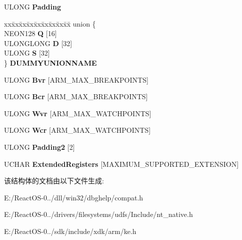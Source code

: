 \begin{DoxyCompactItemize}
U\+L\+O\+NG {\bfseries Padding}
\item 
\mbox{\label{struct___c_o_n_t_e_x_t_a6259ce9211fe00836b7887301ba8e7c3}} 
\begin{tabbing}
xx\=xx\=xx\=xx\=xx\=xx\=xx\=xx\=xx\=\kill
union \{\\
\>NEON128 {\bfseries Q} \mbox{[}16\mbox{]}\\
\>ULONGLONG {\bfseries D} \mbox{[}32\mbox{]}\\
\>ULONG {\bfseries S} \mbox{[}32\mbox{]}\\
\} {\bfseries DUMMYUNIONNAME}\\

\end{tabbing}\item 
\mbox{\label{struct___c_o_n_t_e_x_t_acd64d36dea821c301eb9336bda3dee7c}} 
U\+L\+O\+NG {\bfseries Bvr} \mbox{[}A\+R\+M\+\_\+\+M\+A\+X\+\_\+\+B\+R\+E\+A\+K\+P\+O\+I\+N\+TS\mbox{]}
\item 
\mbox{\label{struct___c_o_n_t_e_x_t_af8dd52b1a2387c35e9978ce4ac0798ef}} 
U\+L\+O\+NG {\bfseries Bcr} \mbox{[}A\+R\+M\+\_\+\+M\+A\+X\+\_\+\+B\+R\+E\+A\+K\+P\+O\+I\+N\+TS\mbox{]}
\item 
\mbox{\label{struct___c_o_n_t_e_x_t_a343bcf5cf087b142b8fc9dfec2f2bf0b}} 
U\+L\+O\+NG {\bfseries Wvr} \mbox{[}A\+R\+M\+\_\+\+M\+A\+X\+\_\+\+W\+A\+T\+C\+H\+P\+O\+I\+N\+TS\mbox{]}
\item 
\mbox{\label{struct___c_o_n_t_e_x_t_a73fdc94e1e76eaf859e38864be6d1e66}} 
U\+L\+O\+NG {\bfseries Wcr} \mbox{[}A\+R\+M\+\_\+\+M\+A\+X\+\_\+\+W\+A\+T\+C\+H\+P\+O\+I\+N\+TS\mbox{]}
\item 
\mbox{\label{struct___c_o_n_t_e_x_t_aa59cdc1fe3470d00151643861a38c288}} 
U\+L\+O\+NG {\bfseries Padding2} \mbox{[}2\mbox{]}
\item 
\mbox{\label{struct___c_o_n_t_e_x_t_ad7822115a1a0e0d14220f7a389f441a1}} 
U\+C\+H\+AR {\bfseries Extended\+Registers} \mbox{[}M\+A\+X\+I\+M\+U\+M\+\_\+\+S\+U\+P\+P\+O\+R\+T\+E\+D\+\_\+\+E\+X\+T\+E\+N\+S\+I\+ON\mbox{]}
\end{DoxyCompactItemize}


该结构体的文档由以下文件生成\+:\begin{DoxyCompactItemize}
\item 
E\+:/\+React\+O\+S-\/0../dll/win32/dbghelp/compat.\+h\item 
E\+:/\+React\+O\+S-\/0../drivers/filesystems/udfs/\+Include/nt\+\_\+native.\+h\item 
E\+:/\+React\+O\+S-\/0../sdk/include/xdk/arm/ke.\+h\end{DoxyCompactItemize}
